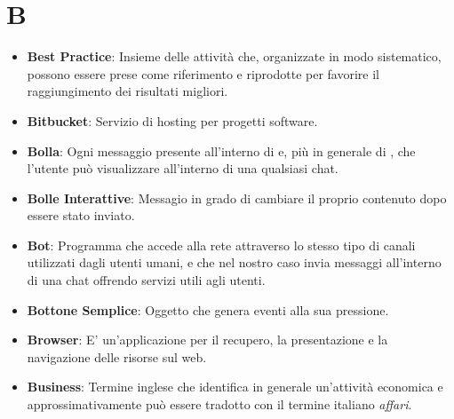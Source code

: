 \section*{B}
\begin{itemize}
	\item
	\textbf{Best Practice}: Insieme delle attività che, organizzate in modo sistematico, possono essere prese come riferimento e riprodotte per favorire il raggiungimento dei risultati migliori.
	\item
	\textbf{Bitbucket}: Servizio di hosting per progetti software.
	\item
	\textbf{Bolla}: Ogni messaggio presente all'interno di  e, più in generale di , che l'utente può visualizzare all'interno di una qualsiasi chat.
	\item
	\textbf{Bolle Interattive}: Messagio in grado di cambiare il proprio contenuto dopo essere stato inviato.
	\item
	\textbf{Bot}: Programma che accede alla rete attraverso lo stesso tipo di canali utilizzati dagli utenti umani, e che nel nostro caso invia messaggi all'interno di una chat offrendo servizi utili agli utenti.
	\item
	\textbf{Bottone Semplice}: Oggetto che genera eventi alla sua pressione.
	\item
	\textbf{Browser}: E' un'applicazione per il recupero, la presentazione e la navigazione delle risorse sul web.
	\item
	\textbf{Business}: Termine inglese che identifica in generale un'attività economica e approssimativamente può essere tradotto con il termine italiano \textit{affari}.
\end{itemize}
\newpage